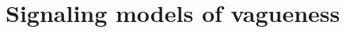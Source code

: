 \documentclass[a4paper]{article}
\begin{document}
%


\section{Signaling models of vagueness}
\label{sec:vague-signaling}


\printbibliography
\end{document}
